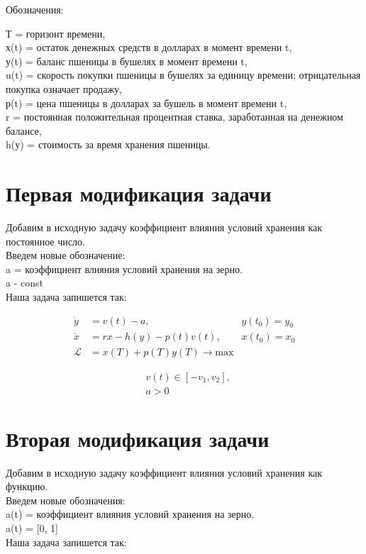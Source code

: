 Обозначения:
 
{Т} = горизонт времени,\\
{х(t)} = остаток денежных средств в долларах в момент времени t,\\
{у(t)} = баланс пшеницы в бушелях в момент времени t,\\ 
{u(t)} = скорость покупки пшеницы в бушелях за единицу времени; отрицательная покупка означает продажу,\\
{р(t)} = цена пшеницы в долларах за бушель в момент времени t,\\
{r} = постоянная положительная процентная ставка, заработанная на денежном балансе,\\
{h(у)} = стоимость за время хранения пшеницы.

\section{Первая модификация задачи}

Добавим в исходную задачу коэффициент влияния условий хранения как постоянное число.\\

Введем новые обозначение:\\
{a} = коэффициент влияния условий хранения на зерно.\\
a - const\\
Наша задача запишется так:

\begin{align}
    \Dot{y} & = v(t) - a, & y(t_{0}) = y_{0} \\
    \Dot{x} & = r x - h(y) - p(t) v(t), & x(t_{0}) = x_{0} \\
    \mathcal{L} & = x(T) + p(T) y(T) \to \mathrm{max}
\end{align}

\begin{align}
    & v(t) \in [-v_{1}, v_{2}], \\
    & a > 0
\end{align}




\section{Вторая модификация задачи}


Добавим в исходную задачу коэффициент влияния условий хранения как функцию.\\
Введем новые обозначения:\\
{a(t)} = коэффициент влияния условий хранения на зерно.\\
a(t) = [0, 1]\\
 Наша задача запишется так:\\

